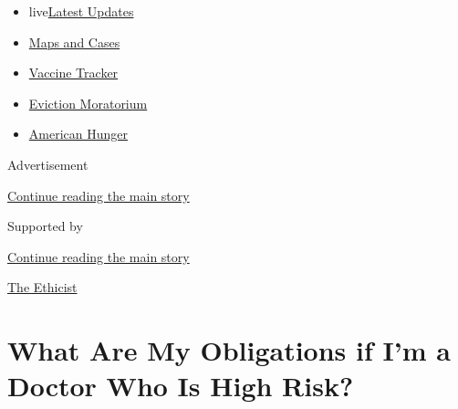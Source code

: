 \begin{itemize}
\tightlist
\item
  live\href{https://www.nytimes3xbfgragh.onion/2020/09/08/world/covid-19-coronavirus.html?name=styln-coronavirus-national\&region=TOP_BANNER\&block=storyline_menu_recirc\&action=click\&pgtype=Article\&impression_id=695e2a30-f1cd-11ea-a3e0-dfa223dac892\&variant=undefined}{Latest
  Updates}
\item
  \href{https://www.nytimes3xbfgragh.onion/interactive/2020/us/coronavirus-us-cases.html?name=styln-coronavirus-national\&region=TOP_BANNER\&block=storyline_menu_recirc\&action=click\&pgtype=Article\&impression_id=695e2a31-f1cd-11ea-a3e0-dfa223dac892\&variant=undefined}{Maps
  and Cases}
\item
  \href{https://www.nytimes3xbfgragh.onion/interactive/2020/science/coronavirus-vaccine-tracker.html?name=styln-coronavirus-national\&region=TOP_BANNER\&block=storyline_menu_recirc\&action=click\&pgtype=Article\&impression_id=695e2a32-f1cd-11ea-a3e0-dfa223dac892\&variant=undefined}{Vaccine
  Tracker}
\item
  \href{https://www.nytimes3xbfgragh.onion/2020/09/02/your-money/eviction-moratorium-covid.html?name=styln-coronavirus-national\&region=TOP_BANNER\&block=storyline_menu_recirc\&action=click\&pgtype=Article\&impression_id=695e2a33-f1cd-11ea-a3e0-dfa223dac892\&variant=undefined}{Eviction
  Moratorium}
\item
  \href{https://www.nytimes3xbfgragh.onion/interactive/2020/09/02/magazine/food-insecurity-hunger-us.html?name=styln-coronavirus-national\&region=TOP_BANNER\&block=storyline_menu_recirc\&action=click\&pgtype=Article\&impression_id=695e2a34-f1cd-11ea-a3e0-dfa223dac892\&variant=undefined}{American
  Hunger}
\end{itemize}

Advertisement

\protect\hyperlink{after-top}{Continue reading the main story}

Supported by

\protect\hyperlink{after-sponsor}{Continue reading the main story}

\href{/column/the-ethicist}{The Ethicist}

\hypertarget{what-are-my-obligations-if-im-a-doctor-who-is-high-risk}{%
\section{What Are My Obligations if I'm a Doctor Who Is High
Risk?}\label{what-are-my-obligations-if-im-a-doctor-who-is-high-risk}}


